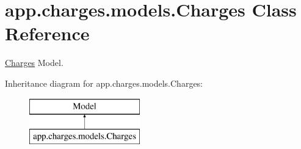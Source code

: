 \hypertarget{classapp_1_1charges_1_1models_1_1_charges}{}\section{app.\+charges.\+models.\+Charges Class Reference}
\label{classapp_1_1charges_1_1models_1_1_charges}


\mbox{\hyperlink{classapp_1_1charges_1_1models_1_1_charges}{Charges}} Model.  


Inheritance diagram for app.\+charges.\+models.\+Charges\+:\begin{figure}[H]
\begin{center}
\leavevmode
\includegraphics[height=2.000000cm]{classapp_1_1charges_1_1models_1_1_charges}
\end{center}
\end{figure}
